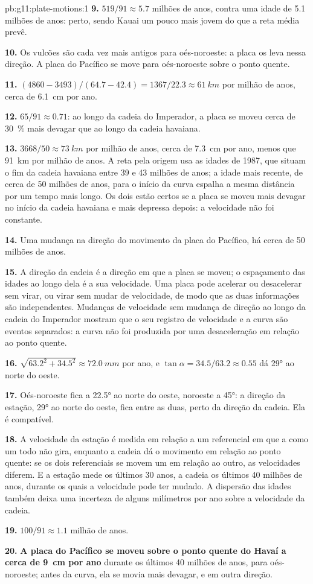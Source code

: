 \begin{solution}{pb:g11:plate-motions:1}
\textbf{9.} $519/91 \approx 5.7$ milhões de anos, contra uma idade de
\num{5.1} milhões de anos: perto, sendo Kauai um pouco mais jovem do que a
reta média prevê.

\textbf{10.} Os vulcões são cada vez mais antigos para oés-noroeste: a placa
os leva nessa direção. A placa do Pacífico se move para oés-noroeste sobre o
ponto quente.

\textbf{11.} $(4860 - 3493)/(64.7 - 42.4) = 1367/22.3 \approx \qty{61}{km}$
por milhão de anos, cerca de \qty{6.1}{cm} por ano.

\textbf{12.} $65/91 \approx 0.71$: ao longo da cadeia do Imperador, a placa
se moveu cerca de \qty{30}{\percent} mais devagar que ao longo da cadeia
havaiana.

\textbf{13.} $3668/50 \approx \qty{73}{km}$ por milhão de anos, cerca de
\qty{7.3}{cm} por ano, menos que \qty{91}{km} por milhão de anos. A reta
pela origem usa as idades de 1987, que situam o fim da cadeia havaiana entre
39 e 43 milhões de anos; a idade mais recente, de cerca de 50 milhões de
anos, para o início da curva espalha a mesma distância por um tempo mais
longo. Os dois estão certos se a placa se moveu mais devagar no início da
cadeia havaiana e mais depressa depois: a velocidade não foi constante.

\textbf{14.} Uma mudança na direção do movimento da placa do Pacífico, há
cerca de 50 milhões de anos.

\textbf{15.} A direção da cadeia é a direção em que a placa se moveu; o
espaçamento das idades ao longo dela é a sua velocidade. Uma placa pode
acelerar ou desacelerar sem virar, ou virar sem mudar de velocidade, de modo
que as duas informações são independentes. Mudanças de velocidade sem
mudança de direção ao longo da cadeia do Imperador mostram que o seu
registro de velocidade e a curva são eventos separados: a curva não foi
produzida por uma desaceleração em relação ao ponto quente.

\textbf{16.} $\sqrt{63.2^2 + 34.5^2} \approx \qty{72.0}{mm}$ por ano, e
$\tan\alpha = 34.5/63.2 \approx 0.55$ dá \ang{29} ao norte do oeste.

\textbf{17.} Oés-noroeste fica a \ang{22.5} ao norte do oeste, noroeste a
\ang{45}: a direção da estação, \ang{29} ao norte do oeste, fica entre as
duas, perto da direção da cadeia. Ela é compatível.

\textbf{18.} A velocidade da estação é medida em relação a um referencial em
que a  como um todo não gira, enquanto a cadeia dá o movimento em
relação ao ponto quente: se os dois referenciais se movem um em relação ao
outro, as velocidades diferem. E a estação mede os últimos 30 anos, a cadeia
os últimos 40 milhões de anos, durante os quais a velocidade pode ter
mudado. A dispersão das idades também deixa uma incerteza de alguns
milímetros por ano sobre a velocidade da cadeia.

\textbf{19.} $100/91 \approx 1.1$ milhão de anos.

\textbf{20.} \textbf{A placa do Pacífico se moveu sobre o ponto quente do
Havaí a cerca de \qty{9}{cm} por ano} durante os últimos 40 milhões de anos,
para oés-noroeste; antes da curva, ela se movia mais devagar, e em outra
direção.
\end{solution}
